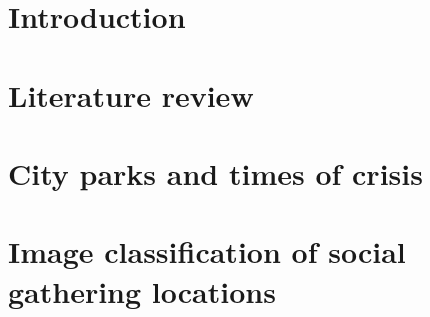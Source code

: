 \documentclass[a4paper, 10pt, openany]{book}
\begin{document}
\makeatletter
\def\@makechapterhead#1{%
  \vspace*{50\p@}%
  {\parindent \z@ \raggedright \normalfont
    \hrule\vspace{0.6cm}%
    \noindent\textnormal{\MakeUppercase{\fontsize{14}{22}\selectfont CHAPTER \thechapter}}\par\nobreak%
    \noindent\fontfamily{phv}\textbf{\MakeUppercase{\fontsize{14}{22}\selectfont #1}}\par\nobreak
    \vspace{0.6cm}%
    \hrule
    \vskip 40\p@ %
  }}
\makeatother


\chapter{Introduction}

\cleardoublepage


\chapter{Literature review}

\cleardoublepage


\chapter{City parks and times of crisis}\label{chapter_03}

\cleardoublepage


\chapter{Image classification of social gathering locations}\label{chapter_04}

\cleardoublepage
\end{document}
